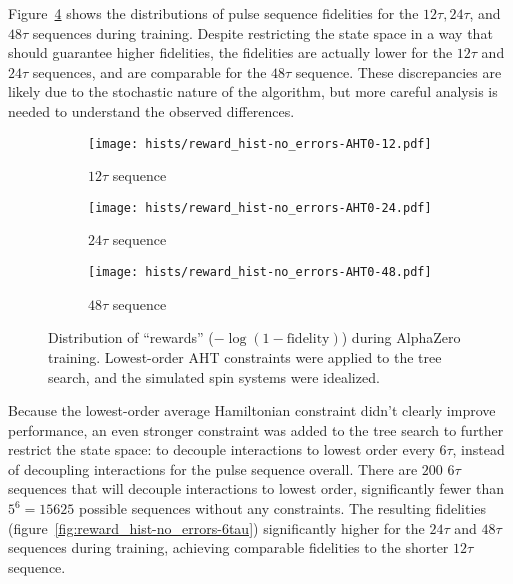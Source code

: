 Figure~\ref{fig:reward_hist-no_errors-AHT0} shows the distributions of pulse sequence fidelities for the $12\tau, 24\tau$, and $48\tau$ sequences during training. Despite restricting the state space in a way that should guarantee higher fidelities, the fidelities are actually lower for the $12\tau$ and $24\tau$ sequences, and are comparable for the $48\tau$ sequence. These discrepancies are likely due to the stochastic nature of the algorithm, but more careful analysis is needed to understand the observed differences.

\begin{figure}[H]
    \centering
    \begin{subfigure}{.49\textwidth}
        \centering
        \texttt{[image: hists/reward\_hist-no\_errors-AHT0-12.pdf]}
        \caption{$12\tau$ sequence}
        \label{fig:reward_hist-no_errors-AHT0-12}
    \end{subfigure}
    \begin{subfigure}{.49\textwidth}
        \centering
        \texttt{[image: hists/reward\_hist-no\_errors-AHT0-24.pdf]}
        \caption{$24\tau$ sequence}
        \label{fig:reward_hist-no_errors-AHT0-24}
    \end{subfigure}
    \begin{subfigure}{.49\textwidth}
        \centering
        \texttt{[image: hists/reward\_hist-no\_errors-AHT0-48.pdf]}
        \caption{$48\tau$ sequence}
        \label{fig:reward_hist-no_errors-AHT0-48}
    \end{subfigure}
    \caption{Distribution of ``rewards'' ($-\log(1 - \text{fidelity})$) during AlphaZero training. Lowest-order AHT constraints were applied to the tree search, and the simulated spin systems were idealized.}
    \label{fig:reward_hist-no_errors-AHT0}
\end{figure}


Because the lowest-order average Hamiltonian constraint didn't clearly improve performance, an even stronger constraint was added to the tree search to further restrict the state space: to decouple interactions to lowest order every $6\tau$, instead of decoupling interactions for the pulse sequence overall.
There are $200$ $6\tau$ sequences that will decouple interactions to lowest order, significantly fewer than $5^6 = 15625$ possible sequences without any constraints. The resulting fidelities (figure~\ref{fig:reward_hist-no_errors-6tau}) significantly higher for the $24\tau$ and $48\tau$ sequences during training, achieving comparable fidelities to the shorter $12\tau$ sequence.

